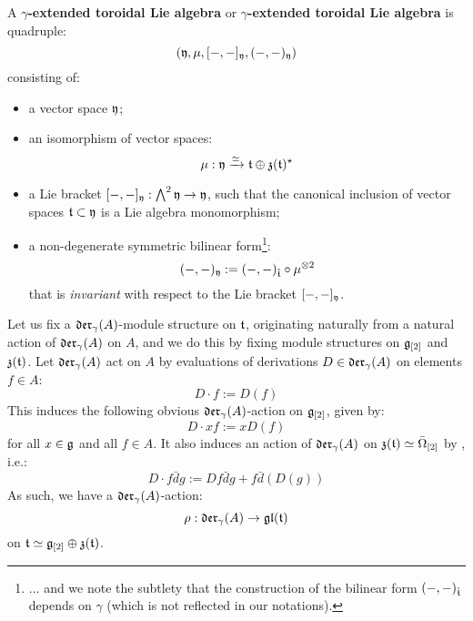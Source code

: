         \begin{definition} \label{def: yangian_extended_toroidal_lie_algebras}
            A \textbf{$\gamma$-extended toroidal Lie algebra} or \textbf{$\gamma$-extended toroidal Lie algebra} is quadruple:
                $$(\mathfrak{y}, \mu, [-, -]_{\mathfrak{y}}, (-, -)_{\mathfrak{y}})$$
            consisting of:
            \begin{itemize}
                \item a vector space $\mathfrak{y}$;
                \item an isomorphism of vector spaces:
                    $$\mu: \mathfrak{y} \xrightarrow[]{\simeq} \mathfrak{t} \oplus \mathfrak{z}(\mathfrak{t})^{\star}$$
                \item a Lie bracket $[-, -]_{\mathfrak{y}}: \bigwedge^2 \mathfrak{y} \to \mathfrak{y}$, such that the canonical inclusion of vector spaces $\mathfrak{t} \subset \mathfrak{y}$ is a Lie algebra monomorphism;
                \item a non-degenerate symmetric bilinear form\footnote{... and we note the subtlety that the construction of the bilinear form $(-, -)_{\hat{\mathfrak{t}}}$ depends on $\gamma$ (which is not reflected in our notations).}:
                    $$(-, -)_{\fraky} := (-, -)_{\extendedtoroidal} \circ \mu^{\tensor 2}$$
                that is \textit{invariant} with respect to the Lie bracket $[-, -]_{\mathfrak{y}}$.
            \end{itemize}
        \end{definition}

        \begin{convention} \label{conv: a_fixed_yangian_div_zero_vector_field_action} 
            Let us fix a $\mathfrak{der}_{\gamma}(A)$-module structure on $\mathfrak{t}$, originating naturally from a natural action of $\mathfrak{der}_{\gamma}(A)$ on $A$, and we do this by fixing module structures on $\mathfrak{g}_{[2]}$ and $\mathfrak{z}(\mathfrak{t})$. Let $\mathfrak{der}_{\gamma}(A)$ act on $A$ by evaluations of derivations $D \in \mathfrak{der}_{\gamma}(A)$ on elements $f \in A$:
                $$D \cdot f := D(f)$$
            This induces the following obvious $\mathfrak{der}_{\gamma}(A)$-action on $\mathfrak{g}_{[2]}$, given by:
                $$D \cdot xf := x D(f)$$
            for all $x \in \mathfrak{g}$ and all $f \in A$. It also induces an action of $\mathfrak{der}_{\gamma}(A)$ on $\mathfrak{z}(\mathfrak{t}) \simeq \bar{\Omega}_{[2]}$ by , i.e.:
                $$D \cdot f\bar{d}g := Df \bar{d}g + f \bar{d}(D(g))$$
            As such, we have a $\mathfrak{der}_{\gamma}(A)$-action:
                $$\rho: \mathfrak{der}_{\gamma}(A) \to \mathfrak{gl}(\mathfrak{t})$$
            on $\mathfrak{t} \simeq \mathfrak{g}_{[2]} \oplus \mathfrak{z}(\mathfrak{t})$.
        \end{convention}

